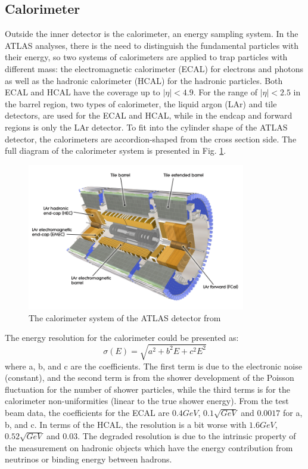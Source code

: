 \subsection{Calorimeter}
Outside the inner detector is the calorimeter, an energy sampling system. In the ATLAS analyses, there is the need to distinguish the fundamental particles with their energy, so two systems of calorimeters are applied to trap particles with different mass: the electromagnetic calorimeter (ECAL) for electrons and photons as well as the hadronic calorimeter (HCAL) for the hadronic particles. Both ECAL and HCAL have the coverage up to $|\eta|<4.9$. For the range of $|\eta|<2.5$ in the barrel region, two types of calorimeter, the liquid argon (LAr) and tile detectors, are used for the ECAL and HCAL, while in the endcap and forward regions is only the LAr detector. To fit into the cylinder shape of the ATLAS detector, the calorimeters are accordion-shaped from the cross section side. The full diagram of the calorimeter system is presented in Fig. \ref{Fig:calorimeter}. 
\begin{figure}[!h]                %
	\includegraphics[width=0.85\textwidth]{Chapter2/calorimeter}
	\centering
	\begin{center}
		\caption{The calorimeter system of the ATLAS detector from \cite{Aad:2008zzm}}
		\label{Fig:calorimeter}            
	\end{center}
\end{figure}
The energy resolution for the calorimeter could be presented as:
\begin{equation}
\sigma (E)=\sqrt{a^{2}+b^{2}E+c^{2}E^{2}}
\end{equation}
where a, b, and c are the coefficients. The first term is due to the electronic noise (constant), and the second term is from the shower development of the Poisson fluctuation for the number of shower particles, while the third terms is for the calorimeter non-uniformities (linear to the true shower energy). From the test beam data, the coefficients for the ECAL are $0.4GeV$, $0.1\sqrt{GeV}$ and $0.0017$ for a, b, and c. In terms of the HCAL, the resolution is a bit worse with $1.6GeV$, $0.52\sqrt{GeV}$ and $0.03$. The degraded resolution is due to the intrinsic property of the measurement on hadronic objects which have the energy contribution from neutrinos or binding energy between hadrons. 
